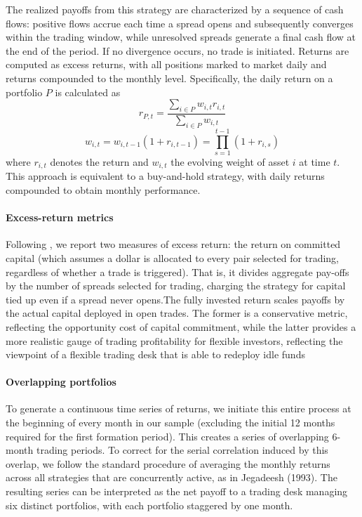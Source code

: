 The realized payoffs from this strategy are characterized by a sequence of cash flows: positive flows accrue each time a spread opens and subsequently converges within the trading window, while unresolved spreads generate a final cash flow at the end of the period. If no divergence occurs, no trade is initiated. Returns are computed as excess returns, with all positions marked to market daily and returns compounded to the monthly level. Specifically, the daily return on a portfolio $P$ is calculated as
$$
r_{P, t} = \frac{\sum_{i \in P} w_{i, t} r_{i, t}}{\sum_{i \in P} w_{i, t}}
$$
$$
w_{i, t} = w_{i, t-1}(1 + r_{i, t-1}) = \prod_{s=1}^{t-1} (1 + r_{i, s})
$$
where $r_{i, t}$ denotes the return and $w_{i, t}$ the evolving weight of asset $i$ at time $t$. This approach is equivalent to a buy-and-hold strategy, with daily returns compounded to obtain monthly performance.

\paragraph{Excess-return metrics}
Following \cite{Gatev2006}, we report two measures of excess return: the return on committed capital (which assumes a dollar is allocated to every pair selected for trading, regardless of whether a trade is triggered). That is, it divides aggregate pay-offs by the number of spreads selected for trading, charging the strategy for capital tied up even if a spread never opens.The fully invested return scales payoffs by the actual capital deployed in open trades. The former is a conservative metric, reflecting the opportunity cost of capital commitment, while the latter provides a more realistic gauge of trading profitability for flexible investors, reflecting the viewpoint of a flexible trading desk that is able to redeploy idle funds

\paragraph{Overlapping portfolios}
To generate a continuous time series of returns, we initiate this entire process at the beginning of every month in our sample (excluding the initial 12 months required for the first formation period). This creates a series of overlapping 6-month trading periods. To correct for the serial correlation induced by this overlap, we follow the standard procedure of averaging the monthly returns across all strategies that are concurrently active, as in Jegadeesh (1993). The resulting series can be interpreted as the net payoff to a trading desk managing six distinct portfolios, with each portfolio staggered by one month.

